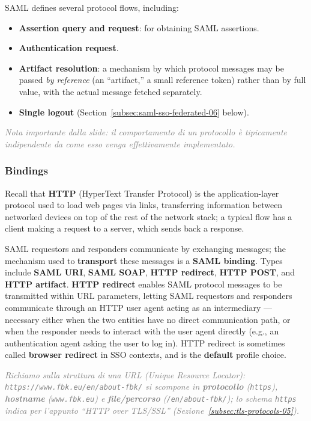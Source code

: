 \documentclass[12pt, a4paper]{article}
\begin{document}
SAML defines several protocol flows, including:
\begin{itemize}
    \item \textbf{Assertion query and request}: for obtaining SAML assertions.
    \item \textbf{Authentication request}.
    \item \textbf{Artifact resolution}: a mechanism by which protocol messages may be passed \emph{by reference} (an ``artifact,'' a small reference token) rather than by full value, with the actual message fetched separately.
    \item \textbf{Single logout} (Section~\ref{subsec:saml-sso-federated-06} below).
\end{itemize}
\textcolor{gray}{\textit{Nota importante dalla slide: il comportamento di un protocollo è tipicamente indipendente da come esso venga effettivamente implementato.}}

\subsubsection{Bindings}
Recall that \textbf{HTTP} (HyperText Transfer Protocol) is the application-layer protocol used to load web pages via links, transferring information between networked devices on top of the rest of the network stack; a typical flow has a client making a request to a server, which sends back a response.

SAML requestors and responders communicate by exchanging messages; the mechanism used to \textbf{transport} these messages is a \textbf{SAML binding}. Types include \textbf{SAML URI}, \textbf{SAML SOAP}, \textbf{HTTP redirect}, \textbf{HTTP POST}, and \textbf{HTTP artifact}. \textbf{HTTP redirect} enables SAML protocol messages to be transmitted within URL parameters, letting SAML requestors and responders communicate through an HTTP user agent acting as an intermediary --- necessary either when the two entities have no direct communication path, or when the responder needs to interact with the user agent directly (e.g., an authentication agent asking the user to log in). HTTP redirect is sometimes called \textbf{browser redirect} in SSO contexts, and is the \textbf{default} profile choice.

\textcolor{gray}{\textit{Richiamo sulla struttura di una URL (\textit{Unique Resource Locator}): \texttt{https://www.fbk.eu/en/about-fbk/} si scompone in \textbf{protocollo} (\texttt{https}), \textbf{hostname} (\texttt{www.fbk.eu}) e \textbf{file/percorso} (\texttt{/en/about-fbk/}); lo schema \texttt{https} indica per l'appunto ``HTTP over TLS/SSL'' (Sezione~\ref{subsec:tls-protocols-05}).}}
\end{document}

